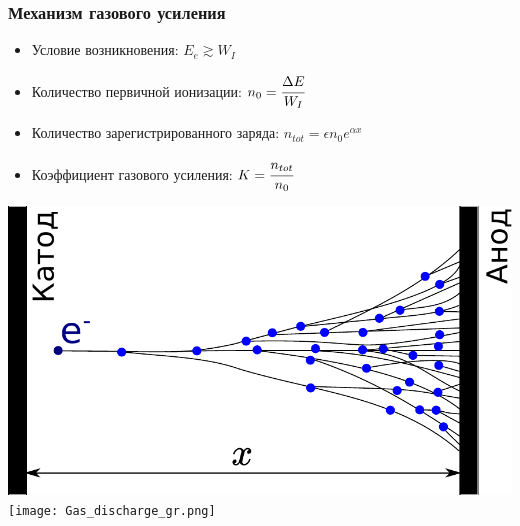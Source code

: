 \documentclass[14pt]{beamer}
\begin{document}
\begin{frame}[t]
\frametitle{Механизм газового усиления}
\begin{minipage}[h]{0.49\linewidth}
	\small
\begin{itemize}
	\item Условие возникновения: $E_e \gtrsim W_I$
	\item Количество первичной ионизации: $n_{0} = \cfrac{\Delta E}{W_I}$
	\item Количество зарегистрированного заряда: $n_{tot} = \epsilon n_{0}  e^{\alpha x}$
	\item Коэффициент газового усиления: $K = \cfrac{n_{tot}}{n_{0}}$
\end{itemize}
\end{minipage}
\begin{minipage}[h]{0.49\linewidth}
	\centering 
	\includegraphics[width=0.8\linewidth]{Electron_avalanche.pdf}
	\texttt{[image: Gas\_discharge\_gr.png]}

\end{minipage}
\end{frame}
\end{document}
